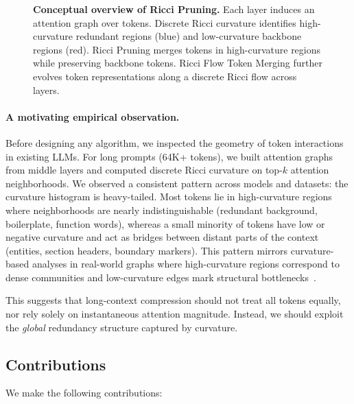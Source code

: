 \documentclass{article}
\theoremstyle{plain}
\theoremstyle{definition}
\theoremstyle{remark}
\begin{document}
\begin{figure}[t]
  \centering
  \fbox{\rule{0pt}{1.2in}\rule{0.95\columnwidth}{0pt}}
  \caption{\textbf{Conceptual overview of Ricci Pruning.} Each layer induces an attention graph over tokens. Discrete Ricci curvature identifies high-curvature redundant regions (blue) and low-curvature backbone regions (red). Ricci Pruning merges tokens in high-curvature regions while preserving backbone tokens. Ricci Flow Token Merging further evolves token representations along a discrete Ricci flow across layers.}
  \label{fig:overview}
\end{figure}

\paragraph{A motivating empirical observation.}
Before designing any algorithm, we inspected the geometry of token interactions in existing LLMs. For long prompts (64K+ tokens), we built attention graphs from middle layers and computed discrete Ricci curvature on top-$k$ attention neighborhoods. We observed a consistent pattern across models and datasets: the curvature histogram is heavy-tailed. Most tokens lie in high-curvature regions where neighborhoods are nearly indistinguishable (redundant background, boilerplate, function words), whereas a small minority of tokens have low or negative curvature and act as bridges between distant parts of the context (entities, section headers, boundary markers). This pattern mirrors curvature-based analyses in real-world graphs where high-curvature regions correspond to dense communities and low-curvature edges mark structural bottlenecks~\citep{ni2019community,sia2019ollivier,tian2025curvatureclustering,yadav2025roadmap}.

This suggests that long-context compression should not treat all tokens equally, nor rely solely on instantaneous attention magnitude. Instead, we should exploit the \emph{global} redundancy structure captured by curvature.

\subsection{Contributions}

We make the following contributions:
\end{document}
